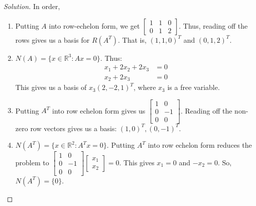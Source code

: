 \documentclass{article}
\theoremstyle{mystyle}
\begin{document}
\begin{proof}[Solution] In order,
\begin{enumerate}
    \item Putting $A$ into row-echelon form, we get $\begin{bmatrix} 1 & 1 & 0 \\ 0 & 1 & 2 \end{bmatrix}$. Thus, reading off the rows gives us a basis for $R(A^T)$. That is, $(1,1,0)^T$ and $(0,1,2)^T$.
    \item $N(A) = \{x\in \mathbb{R}^3: Ax = 0\}$. Thus:
    \begin{align*}
        x_1 + 2x_2 + 2x_3 &= 0\\
        x_2 + 2x_3 &= 0
    \end{align*}
    This gives us a basis of $x_3(2,-2,1)^T$, where $x_3$ is a free variable.
    \item Putting $A^T$ into row echelon form gives us $\begin{bmatrix} 1 & 0 \\ 0 & -1 \\ 0 & 0 \end{bmatrix}$. Reading off the non-zero row vectors gives us a basis: $(1,0)^T, (0,-1)^T$.
    \item $N(A^T)= \{x\in \mathbb{R}^2: A^T x = 0\}$. Putting $A^T$ into row echelon form reduces the problem to $\begin{bmatrix} 1 & 0 \\ 0 & -1 \\ 0 & 0 \end{bmatrix} \begin{bmatrix} x_1 \\ x_2 \end{bmatrix} = 0$. This gives $x_1 = 0$ and $-x_2 = 0$. So, $N(A^T) = \{0\}$.
\end{enumerate}
\end{proof}
\end{document}
